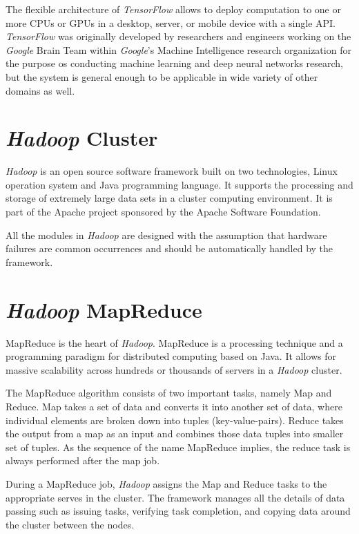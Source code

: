 \documentclass[12pt,notitlepage,oneside]{report}
\begin{document}
The flexible architecture of \textit{TensorFlow} allows to deploy computation to one or more CPUs or GPUs in a desktop, server, or mobile device with a single API. \textit{TensorFlow} was originally developed by researchers and engineers working on the \textit{Google} Brain Team within \textit{Google}'s Machine Intelligence research organization for the purpose os conducting machine learning and deep neural networks research, but the system is general enough to be applicable in wide variety of other domains as well.


\section{\textit{Hadoop} Cluster}
\textit{Hadoop} \cite{116} is an open source software framework built on two technologies, Linux operation system and Java programming language. It supports the processing and storage of extremely large data sets in a cluster computing environment. It is part of the Apache project sponsored by the Apache Software Foundation.

All the modules in \textit{Hadoop} are designed with the assumption that hardware failures are common occurrences and should be automatically handled by the framework. 

\section{\textit{Hadoop} MapReduce}
MapReduce is the heart of \textit{Hadoop}. MapReduce is a processing technique and a programming paradigm for distributed computing based on Java. It allows for massive scalability across hundreds or thousands of servers in a \textit{Hadoop} cluster.

The MapReduce algorithm consists of two important tasks, namely Map and Reduce. Map takes a set of data and converts it into another set of data, where individual elements are broken down into tuples (key-value-pairs). Reduce takes the output from a map as an input and combines those data tuples into smaller set of tuples. As the sequence of the name MapReduce implies, the reduce task is always performed after the map job.

During a MapReduce job, \textit{Hadoop} assigns the Map and Reduce tasks to the appropriate serves in the cluster. The framework manages all the details of data passing such as issuing tasks, verifying task completion, and copying data around the cluster between the nodes.
\end{document}
